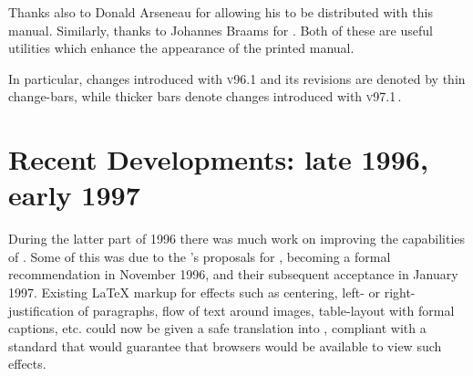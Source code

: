 \latex{\bigskip}\htmlrule

%
\noindent
Thanks also to Donald Arseneau  for allowing his 
to be distributed with this manual.
Similarly, thanks to Johannes Braams  for .
%
\html{\\}%
Both of these are useful utilities which enhance the appearance of the printed manual.
\begin{latexonly}%
In particular, changes introduced with  \textsc{v96.1} and its revisions are denoted
by thin change-bars, while thicker bars denote changes introduced with  \textsc{v97.1}\,.%
\end{latexonly}



\clearpage
\section*{Recent Developments: late 1996, early 1997\label{recent97}}%
%
During the latter part of 1996 there was much work on improving the
capabilities of \latextohtml.
Some of this was due to the \WiiiC's proposals for \HTMLiii,
becoming a formal recommendation in November 1996,
and their subsequent acceptance in January 1997.
Existing \LaTeX{} markup for effects such as centering, left-
or right-justification of paragraphs,
flow of text around images, table-layout with formal captions, etc.
could now be given a safe translation into \HTMLiii, compliant with a standard
that would guarantee that browsers would be available to view such effects.

